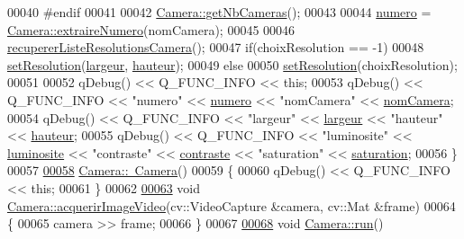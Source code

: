 \begin{DoxyCode}
00040 \textcolor{preprocessor}{    #endif}
00041 
00042     \hyperlink{class_camera_a116b3869ff0647c851715605a1938a3c}{Camera::getNbCameras}();
00043 
00044     \hyperlink{class_camera_ae5cda5df3c9c49b88fff15389a1bbc64}{numero} = \hyperlink{class_camera_aa3fdc8b3feac7074911b472c4edb9dec}{Camera::extraireNumero}(nomCamera);
00045 
00046     \hyperlink{class_camera_a97267488c5756b4217d4e1fbc68008fd}{recupererListeResolutionsCamera}();
00047     \textcolor{keywordflow}{if}(choixResolution == -1)
00048         \hyperlink{class_camera_a966d13a5bf22c776f8d776d3da19182a}{setResolution}(\hyperlink{class_camera_ad64f26cdfc5aa561208b273d430938cf}{largeur}, \hyperlink{class_camera_a5d89d7f9d1a5eab4175dd168c7fbf1c7}{hauteur});
00049     \textcolor{keywordflow}{else}
00050         \hyperlink{class_camera_a966d13a5bf22c776f8d776d3da19182a}{setResolution}(choixResolution);
00051 
00052     qDebug() << Q\_FUNC\_INFO << \textcolor{keyword}{this};
00053     qDebug() << Q\_FUNC\_INFO << \textcolor{stringliteral}{"numero"} << \hyperlink{class_camera_ae5cda5df3c9c49b88fff15389a1bbc64}{numero} << \textcolor{stringliteral}{"nomCamera"} << 
      \hyperlink{class_camera_ac1cdaf82921d2a2f3f941d867718eba2}{nomCamera};
00054     qDebug() << Q\_FUNC\_INFO << \textcolor{stringliteral}{"largeur"} << \hyperlink{class_camera_ad64f26cdfc5aa561208b273d430938cf}{largeur} << \textcolor{stringliteral}{"hauteur"} << 
      \hyperlink{class_camera_a5d89d7f9d1a5eab4175dd168c7fbf1c7}{hauteur};
00055     qDebug() << Q\_FUNC\_INFO << \textcolor{stringliteral}{"luminosite"} << \hyperlink{class_camera_aca5433bf19773161142d73009469b1ed}{luminosite} << \textcolor{stringliteral}{"contraste"} << 
      \hyperlink{class_camera_ad3b300e52c91341d985d3b54f562a0f7}{contraste} << \textcolor{stringliteral}{"saturation"} << \hyperlink{class_camera_afd46d6d2451ee33b68dbc74713f2687c}{saturation};
00056 \}
00057 
\hyperlink{class_camera_ad1897942d0ccf91052386388a497349f}{00058} \hyperlink{class_camera_ad1897942d0ccf91052386388a497349f}{Camera::~Camera}()
00059 \{
00060     qDebug() << Q\_FUNC\_INFO << \textcolor{keyword}{this};
00061 \}
00062 
\hyperlink{class_camera_afbddcda62053404cbf06a4ba48c62732}{00063} \textcolor{keywordtype}{void} \hyperlink{class_camera_afbddcda62053404cbf06a4ba48c62732}{Camera::acquerirImageVideo}(cv::VideoCapture &camera, cv::Mat &frame)
00064 \{
00065     camera >> frame;
00066 \}
00067 
\hyperlink{class_camera_aaa3745c0cf0f286ef80b7eeebc248cc9}{00068} \textcolor{keywordtype}{void} \hyperlink{class_camera_aaa3745c0cf0f286ef80b7eeebc248cc9}{Camera::run}()

\end{DoxyCode}
